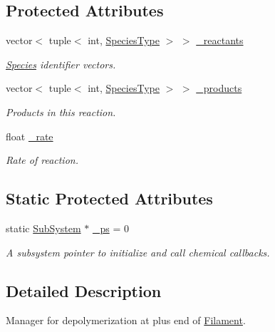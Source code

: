 \subsection*{Protected Attributes}
\begin{DoxyCompactItemize}
\item 
vector$<$ tuple$<$ int, \hyperlink{Species_8h_a50651af47c56ea0e27235468d23542cf}{Species\+Type} $>$ $>$ \hyperlink{classInternalFilamentRxnManager_a63de9061c3da4ad03cf4c530d2774979}{\+\_\+reactants}
\begin{DoxyCompactList}\small\item\em \hyperlink{classSpecies}{Species} identifier vectors. \end{DoxyCompactList}\item 
vector$<$ tuple$<$ int, \hyperlink{Species_8h_a50651af47c56ea0e27235468d23542cf}{Species\+Type} $>$ $>$ \hyperlink{classInternalFilamentRxnManager_afd213da1a3706e2e88962e5da886a5dc}{\+\_\+products}
\begin{DoxyCompactList}\small\item\em Products in this reaction. \end{DoxyCompactList}\item 
float \hyperlink{classInternalFilamentRxnManager_a8b98dd9e6f5d016149f5434b891806df}{\+\_\+rate}
\begin{DoxyCompactList}\small\item\em Rate of reaction. \end{DoxyCompactList}\end{DoxyCompactItemize}
\subsection*{Static Protected Attributes}
\begin{DoxyCompactItemize}
\item 
static \hyperlink{classSubSystem}{Sub\+System} $\ast$ \hyperlink{classInternalFilamentRxnManager_a973ce9cc2aae811e6867afa46193c5f2}{\+\_\+ps} = 0
\begin{DoxyCompactList}\small\item\em A subsystem pointer to initialize and call chemical callbacks. \end{DoxyCompactList}\end{DoxyCompactItemize}


\subsection{Detailed Description}
Manager for depolymerization at plus end of \hyperlink{classFilament}{Filament}. 

